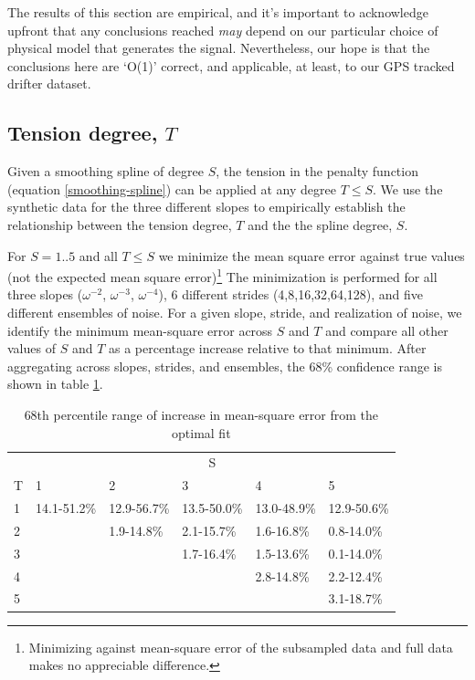 \documentclass[10pt,journal]{IEEEtran}
\begin{document}
The results of this section are empirical, and it's important to acknowledge upfront that any conclusions reached \emph{may} depend on our particular choice of physical model that generates the signal. Nevertheless, our hope is that the conclusions here are `O(1)' correct, and applicable, at least, to our GPS tracked drifter dataset.



\subsection{Tension degree, $T$} \label{tension_degree}

Given a smoothing spline of degree $S$, the tension in the penalty function (equation \ref{smoothing-spline}) can be applied at any degree $T\leq S$. We use the synthetic data for the three different slopes to empirically establish the relationship between the tension degree, $T$ and the the spline degree, $S$. 

For $S=1..5$ and all $T\leq S$ we minimize the mean square error against true values (not the expected mean square error)\footnote{Minimizing against mean-square error of the subsampled data and full data makes no appreciable difference.} The minimization is performed for all three slopes ($\omega^{-2}$, $\omega^{-3}$, $\omega^{-4}$), 6 different strides (4,8,16,32,64,128), and five different ensembles of noise. For a given slope, stride, and realization of noise, we identify the minimum mean-square error across $S$ and $T$ and compare all other values of $S$ and $T$ as a percentage increase relative to that minimum. After aggregating across slopes, strides, and ensembles, the 68\% confidence range is shown in table \ref{optimal_T}.

\begin{table}[ht]
\caption{68th percentile range of increase in mean-square error from the optimal fit}
\label{optimal_T}
\centering
\begin{tabular}{l *{5}{l}}
\toprule & \multicolumn{5}{c}{S} \\ 
\cmidrule(lr){2-6} 
T & 1 & 2 & 3 & 4 & 5 \\ \midrule 
1 & 14.1-51.2\% & 12.9-56.7\% & 13.5-50.0\% & 13.0-48.9\% & 12.9-50.6\% \\ 
2 & & 1.9-14.8\% & 2.1-15.7\% & 1.6-16.8\% & 0.8-14.0\% \\ 
3 & & & 1.7-16.4\% & 1.5-13.6\% & 0.1-14.0\% \\ 
4 & & & & 2.8-14.8\% & 2.2-12.4\% \\ 
5 & & & & & 3.1-18.7\% \\ 
 \bottomrule 
\end{tabular} 
\end{table}
\end{document}
